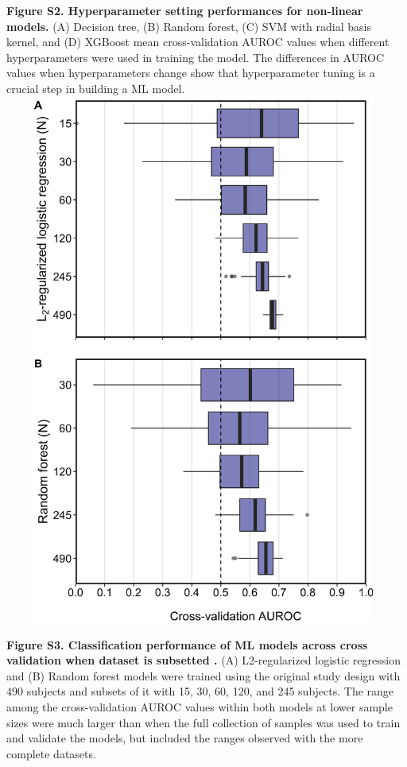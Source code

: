 \documentclass[11pt,]{article}
\begin{document}
\textbf{Figure S2. Hyperparameter setting performances for non-linear
models.} (A) Decision tree, (B) Random forest, (C) SVM with radial basis
kernel, and (D) XGBoost mean cross-validation AUROC values when
different hyperparameters were used in training the model. The
differences in AUROC values when hyperparameters change show that
hyperparameter tuning is a crucial step in building a ML model. \newpage
\includegraphics[height=17.5cm, width=13cm]{Figure_S3.png}

\textbf{Figure S3. Classification performance of ML models across cross
validation when dataset is subsetted .} (A) L2-regularized logistic
regression and (B) Random forest models were trained using the original
study design with 490 subjects and subsets of it with 15, 30, 60, 120,
and 245 subjects. The range among the cross-validation AUROC values
within both models at lower sample sizes were much larger than when the
full collection of samples was used to train and validate the models,
but included the ranges observed with the more complete datasets.
\end{document}

